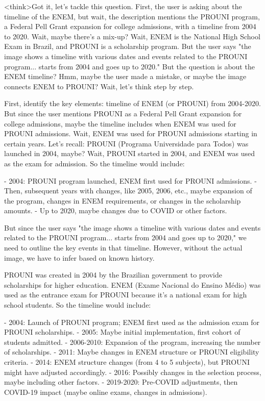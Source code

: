 <think>Got it, let's tackle this question. First, the user is asking about the timeline of the ENEM, but wait, the description mentions the PROUNI program, a Federal Pell Grant expansion for college admissions, with a timeline from 2004 to 2020. Wait, maybe there's a mix-up? Wait, ENEM is the National High School Exam in Brazil, and PROUNI is a scholarship program. But the user says "the image shows a timeline with various dates and events related to the PROUNI program... starts from 2004 and goes up to 2020." But the question is about the ENEM timeline? Hmm, maybe the user made a mistake, or maybe the image connects ENEM to PROUNI? Wait, let's think step by step.

First, identify the key elements: timeline of ENEM (or PROUNI) from 2004-2020. But since the user mentions PROUNI as a Federal Pell Grant expansion for college admissions, maybe the timeline includes when ENEM was used for PROUNI admissions. Wait, ENEM was used for PROUNI admissions starting in certain years. Let's recall: PROUNI (Programa Universidade para Todos) was launched in 2004, maybe? Wait, PROUNI started in 2004, and ENEM was used as the exam for admission. So the timeline would include:

- 2004: PROUNI program launched, ENEM first used for PROUNI admissions.
- Then, subsequent years with changes, like 2005, 2006, etc., maybe expansion of the program, changes in ENEM requirements, or changes in the scholarship amounts.
- Up to 2020, maybe changes due to COVID or other factors.

But since the user says "the image shows a timeline with various dates and events related to the PROUNI program... starts from 2004 and goes up to 2020," we need to outline the key events in that timeline. However, without the actual image, we have to infer based on known history.

PROUNI was created in 2004 by the Brazilian government to provide scholarships for higher education. ENEM (Exame Nacional do Ensino Médio) was used as the entrance exam for PROUNI because it's a national exam for high school students. So the timeline would include:

- 2004: Launch of PROUNI program; ENEM first used as the admission exam for PROUNI scholarships.
- 2005: Maybe initial implementation, first cohort of students admitted.
- 2006-2010: Expansion of the program, increasing the number of scholarships.
- 2011: Maybe changes in ENEM structure or PROUNI eligibility criteria.
- 2014: ENEM structure changes (from 4 to 5 subjects), but PROUNI might have adjusted accordingly.
- 2016: Possibly changes in the selection process, maybe including other factors.
- 2019-2020: Pre-COVID adjustments, then COVID-19 impact (maybe online exams, changes in admissions).

